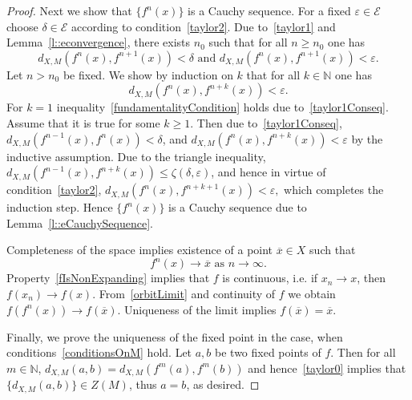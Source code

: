 \documentclass[10pt,a4paper]{amsart}
\newcommand{\EE}{\mathcal{E}}
\newcommand{\NN}{\mathbb N}
\begin{document}
\begin{proof}
Next we show that  $\{f^n(x)\}$ is a Cauchy sequence.  For a fixed $\varepsilon\in \EE$ choose $\delta\in \EE$ according to condition~\eqref{taylor2}. Due to~\eqref{taylor1} and Lemma~\ref{l::econvergence}, there exists  $n_0$ such that for all $n\ge n_0$ one has
\begin{equation}\label{taylor1Conseq}
d_{X,M}(f^n(x),f^{n+1}(x))<\delta \text{ and } d_{X,M}(f^n(x),f^{n+1}(x))<\varepsilon.  
\end{equation}
Let $n> n_0$ be fixed. We show by induction on $k$ that for all $k\in \NN$  one has
\begin{equation}\label{fundamentalityCondition}
d_{X,M}(f^n(x),f^{n+k}(x))<\varepsilon.
\end{equation}
For $k=1$ inequality~\eqref{fundamentalityCondition} holds due to~\eqref{taylor1Conseq}. Assume that it is true for some $k \geq 1$. Then due to~\eqref{taylor1Conseq}, $d_{X,M}(f^{n-1}(x),f^{n}(x))<\delta$, and $d_{X,M}(f^n(x),f^{n+k}(x))<\varepsilon$ by the inductive assumption. Due to the triangle inequality, $d_{X,M}(f^{n-1}(x),f^{n+k}(x))\leq \zeta(\delta,\varepsilon)$, and hence in virtue of condition~\eqref{taylor2}, 
$
d_{X,M}(f^n(x),f^{n+k+1}(x))<\varepsilon,
$
which completes the induction step. Hence $\{f^n(x)\}$ is a Cauchy sequence due to Lemma~\ref{l::eCauchySequence}.

Completeness of the space implies existence of a point $\overline{x}\in X$ such that 
\begin{equation}\label{orbitLimit}
    f^n(x)\to\overline{x} \text{ as } n\to\infty.
\end{equation}
Property~\eqref{fIsNonExpanding} implies that $f$ is continuous, i.e. if $x_n\to x$, then $f(x_n)\to f(x)$. 
From~\eqref{orbitLimit} and continuity of $f$ we obtain $f(f^n(x))\to f(\overline{x})$. Uniqueness of the limit implies
$f(\overline{x})=\overline{x}$.

Finally, we prove the uniqueness of the fixed point  in the case, when conditions~\ref{conditionsOnM} hold. Let $a,b$ be two fixed points of $f$. Then for all $m\in\NN$,  $d_{X,M}(a,b) = d_{X,M}(f^m(a),f^m(b))$ and hence~\eqref{taylor0} implies that $\{d_{X,M}(a,b)\}\in Z(M)$, thus $a=b$, as desired.
\end{proof}
\end{document}

